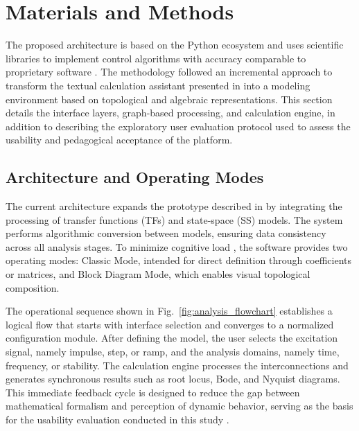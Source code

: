 \documentclass[conference]{IEEEtran}
\begin{document}
\section{Materials and Methods}

The proposed architecture is based on the Python ecosystem and uses scientific libraries to implement control algorithms with accuracy comparable to proprietary software \cite{reznichenko2025,kim2023}. The methodology followed an incremental approach to transform the textual calculation assistant presented in \cite{nascimento2025} into a modeling environment based on topological and algebraic representations. This section details the interface layers, graph-based processing, and calculation engine, in addition to describing the exploratory user evaluation protocol used to assess the usability and pedagogical acceptance of the platform.

\subsection{Architecture and Operating Modes}

The current architecture expands the prototype described in \cite{nascimento2025} by integrating the processing of transfer functions (TFs) and state-space (SS) models. The system performs algorithmic conversion between models, ensuring data consistency across all analysis stages. To minimize cognitive load \cite{SWELLER2024102423}, the software provides two operating modes: Classic Mode, intended for direct definition through coefficients or matrices, and Block Diagram Mode, which enables visual topological composition.

The operational sequence shown in Fig.~\ref{fig:analysis_flowchart} establishes a logical flow that starts with interface selection and converges to a normalized configuration module. After defining the model, the user selects the excitation signal, namely impulse, step, or ramp, and the analysis domains, namely time, frequency, or stability. The calculation engine processes the interconnections and generates synchronous results such as root locus, Bode, and Nyquist diagrams. This immediate feedback cycle is designed to reduce the gap between mathematical formalism and perception of dynamic behavior, serving as the basis for the usability evaluation conducted in this study \cite{guzman2014}.
\end{document}
